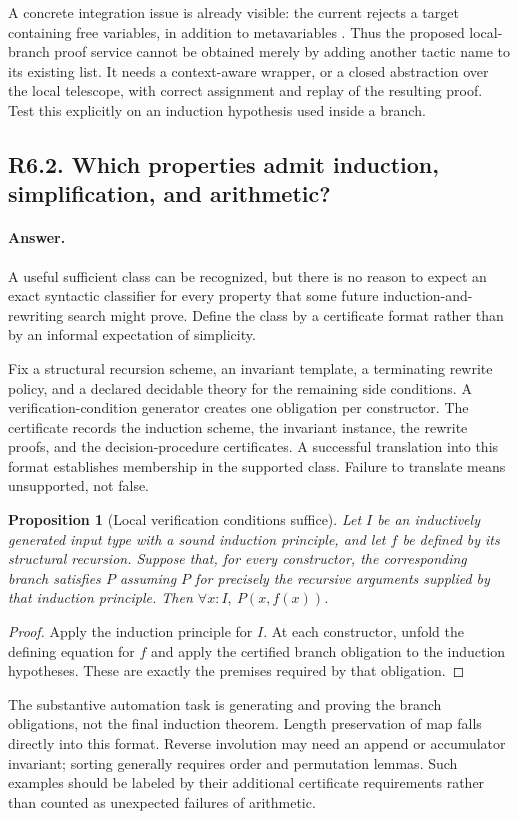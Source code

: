 \documentclass[11pt,a4paper]{article}
\newcommand{\code}[1]{\texttt{\detokenize{#1}}}
\newcommand{\answer}{\paragraph{Answer.}}
\newtheorem{proposition}{Proposition}[section]
\theoremstyle{definition}
\theoremstyle{remark}
\begin{document}
A concrete integration issue is already visible: the current
\code{proofPortfolio} rejects a target containing free variables, in addition to
metavariables \cite{repo}. Thus the proposed local-branch proof service cannot be
obtained merely by adding another tactic name to its existing list. It needs a
context-aware wrapper, or a closed abstraction over the local telescope, with
correct assignment and replay of the resulting proof. Test this explicitly on
an induction hypothesis used inside a branch.

\subsection{R6.2. Which properties admit induction, simplification, and arithmetic?}
\answer A useful sufficient class can be recognized, but there is no reason to
expect an exact syntactic classifier for every property that some future
induction-and-rewriting search might prove. Define the class by a certificate
format rather than by an informal expectation of simplicity.

Fix a structural recursion scheme, an invariant template, a terminating rewrite
policy, and a declared decidable theory for the remaining side conditions. A
verification-condition generator creates one obligation per constructor. The
certificate records the induction scheme, the invariant instance, the rewrite
proofs, and the decision-procedure certificates. A successful translation into
this format establishes membership in the supported class. Failure to translate
means unsupported, not false.

\begin{proposition}[Local verification conditions suffice]
\label{prop:localvc}
Let $I$ be an inductively generated input type with a sound induction principle,
and let $f$ be defined by its structural recursion. Suppose that, for every
constructor, the corresponding branch satisfies $P$ assuming $P$ for precisely
the recursive arguments supplied by that induction principle. Then
$\forall x:I,\ P(x,f(x))$.
\end{proposition}
\begin{proof}
Apply the induction principle for $I$. At each constructor, unfold the defining
equation for $f$ and apply the certified branch obligation to the induction
hypotheses. These are exactly the premises required by that obligation.
\end{proof}
The substantive automation task is generating and proving the branch obligations,
not the final induction theorem. Length preservation of map falls directly into
this format. Reverse involution may need an append or accumulator invariant;
sorting generally requires order and permutation lemmas. Such examples should
be labeled by their additional certificate requirements rather than counted as
unexpected failures of arithmetic.
\end{document}
